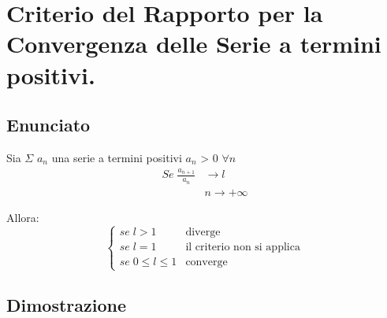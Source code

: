 \documentclass[../dimostrazioni]{subfiles}
\begin{document}
    \chapter{Criterio del Rapporto per la Convergenza delle Serie a termini positivi.}
    \label{criterioRapportoSerie}

        \section*{Enunciato}

            Sia \(\Sigma\) \(a_n\) una serie a termini positivi \(a_n\) > 0 \(\forall n\)
            \begin{align*}
                Se \; \frac{a_{n+1}}{a_n} &\longrightarrow l \\
                &n  \rightarrow +\infty
            \end{align*}
            
            Allora:
            \[
                \left\{
                    \begin{aligned}
                        se \; l > 1 & \text{diverge} \\
                        se \; l = 1 & \text{il criterio non si applica} \\
                        se \; 0 \leqslant l \leqslant 1 & \text{converge}
                    \end{aligned}
                \right.
            \]
            
        \section*{Dimostrazione}
\end{document}
